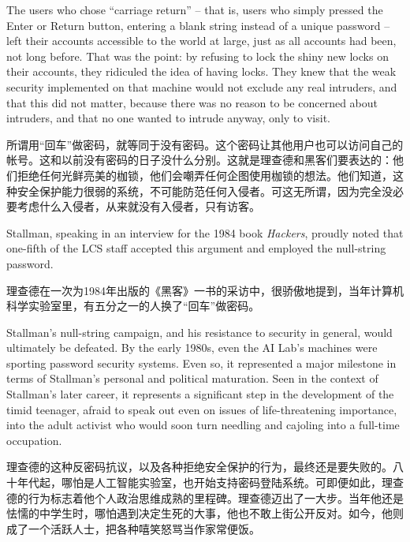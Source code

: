 \ifdefined\eng
The users who chose ``carriage return'' -- that is, users who simply pressed the Enter or Return button, entering a blank string instead of a unique password -- left their accounts accessible to the world at large, just as all accounts had been, not long before. That was the point: by refusing to lock the shiny new locks on their accounts, they ridiculed the idea of having locks. They knew that the weak security implemented on that machine would not exclude any real intruders, and that this did not matter, because there was no reason to be concerned about intruders, and that no one wanted to intrude anyway, only to visit.
\fi

\ifdefined\chs
所谓用``回车''做密码，就等同于没有密码。这个密码让其他用户也可以访问自己的帐号。这和以前没有密码的日子没什么分别。这就是理查德和黑客们要表达的：他们拒绝任何光鲜亮美的枷锁，他们会嘲弄任何企图使用枷锁的想法。他们知道，这种安全保护能力很弱的系统，不可能防范任何入侵者。可这无所谓，因为完全没必要考虑什么入侵者，从来就没有入侵者，只有访客。
\fi

\ifdefined\eng
Stallman, speaking in an interview for the 1984 book \textit{Hackers}, proudly noted that one-fifth of the LCS staff accepted this argument and employed the null-string password.
\fi

\ifdefined\chs
理查德在一次为1984年出版的《黑客》一书的采访中，很骄傲地提到，当年计算机科学实验室里，有五分之一的人换了``回车''做密码。
\fi

\ifdefined\eng
Stallman's null-string campaign, and his resistance to security in general, would ultimately be defeated. By the early 1980s, even the AI Lab's machines were sporting password security systems. Even so, it represented a major milestone in terms of Stallman's personal and political maturation. Seen in the context of Stallman's later career, it represents a significant step in the development of the timid teenager, afraid to speak out even on issues of life-threatening importance, into the adult activist who would soon turn needling and cajoling into a full-time occupation.
\fi

\ifdefined\chs
理查德的这种反密码抗议，以及各种拒绝安全保护的行为，最终还是要失败的。八十年代起，哪怕是人工智能实验室，也开始支持密码登陆系统。可即便如此，理查德的行为标志着他个人政治思维成熟的里程碑。理查德迈出了一大步。当年他还是怯懦的中学生时，哪怕遇到决定生死的大事，他也不敢上街公开反对。如今，他则成了一个活跃人士，把各种嘻笑怒骂当作家常便饭。
\fi

